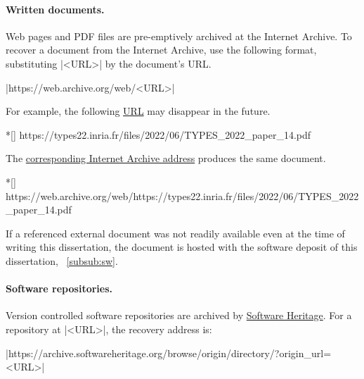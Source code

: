 \paragraph*{Written documents.}
Web pages and PDF files are pre-emptively archived at the Internet Archive.
To recover a document from the Internet Archive, use the following format, substituting \pr|<URL>| by the document's URL\@.

\begin{center}
\pr|https://web.archive.org/web/<URL>|
\end{center}

For example, the following \href{https://types22.inria.fr/files/2022/06/TYPES_2022_paper_14.pdf}{URL} may disappear in the future.

\begin{center}
\begin{minipage}{\textwidth}
\begin{cmdlisting}*[]
https://types22.inria.fr/files/2022/06/TYPES_2022_paper_14.pdf
\end{cmdlisting}
\end{minipage}
\end{center}

The \href{https://web.archive.org/web/https://types22.inria.fr/files/2022/06/TYPES_2022_paper_14.pdf}{corresponding Internet Archive address} produces the same document.

\begin{center}
\begin{minipage}{\textwidth}
\begin{cmdlisting}*[]
https://web.archive.org/web/https://types22.inria.fr/files/2022/06/TYPES_2022_paper_14.pdf
\end{cmdlisting}
\end{minipage}
\end{center}

If a referenced external document was not readily available even at the time of writing this dissertation,
the document is hosted with the software deposit of this dissertation, \cf~\autoref{subsub:sw}.

\paragraph*{Software repositories.}
Version controlled software repositories are archived by \href{https://softwareheritage.org/}{Software Heritage}.
For a repository at \pr|<URL>|, the recovery address is:

\begin{center}
\pr|https://archive.softwareheritage.org/browse/origin/directory/?origin_url=<URL>|
\end{center}

